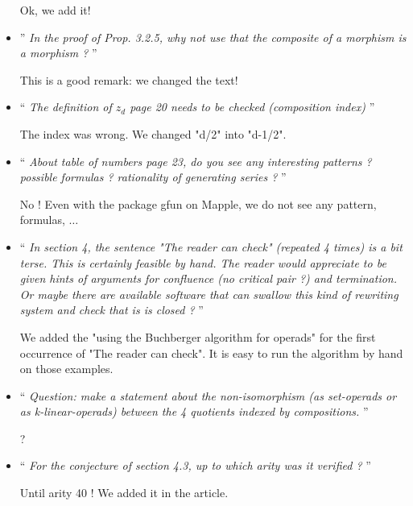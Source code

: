 \documentclass[10pt,reqno]{amsart}
\numberwithin{equation}{subsection}
\begin{document}
\begin{itemize}
  Ok, we add it!
  \medbreak

\item ''{\it
  In the proof of Prop. 3.2.5, why not use that the composite of a
  morphism is a morphism ?
}''
  \smallbreak

  This is a good remark: we changed the text!
  \medbreak
  
\item `` {\it
The definition of $z_d$ page 20 needs to be checked (composition index)
}''
\smallbreak

The index was wrong. We changed "d/2" into "d-1/2".
\medbreak

\item `` {\it
About table of numbers page 23, do you see any interesting patterns ? 
possible formulas ? rationality of generating series ?
}''
\smallbreak

No ! Even with the package gfun on Mapple, we do not 
see any pattern, formulas, $\dots$
\medbreak

\item `` {\it
In section 4, the sentence "The reader can check" (repeated 4 times) 
is a bit terse. This is certainly feasible by hand. The reader would 
appreciate to be given hints of arguments for confluence (no critical 
pair ?) and termination. Or maybe there are available software that 
can swallow this kind of rewriting system and check that is is closed ?
}''
\smallbreak

We added the "using the Buchberger algorithm for operads" for the first 
occurrence of "The reader can check". It is easy to run the algorithm 
by hand on those examples.
\medbreak

\item `` {\it
Question: make a statement about the non-isomorphism (as set-operads 
or as k-linear-operads) between the 4 quotients indexed by compositions.
}''
\smallbreak

?
\medbreak

\item `` {\it
For the conjecture of section 4.3, up to which arity was it verified ?
}''
\smallbreak

Until arity 40 ! We added it in the article.
\medbreak

\end{itemize}
\end{document}
